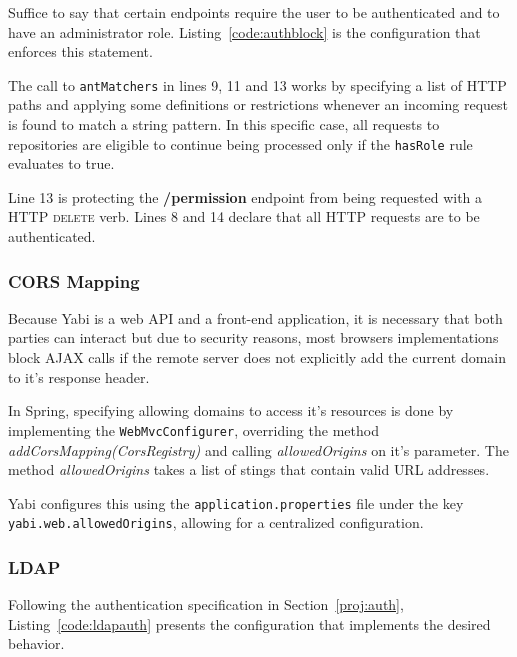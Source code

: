 Suffice to say that certain endpoints require the user to be authenticated and to have an administrator role. Listing~\ref{code:authblock} is the configuration that enforces this statement.

The call to \texttt{antMatchers} in lines 9, 11 and 13 works by specifying a list of \gls{HTTP} paths and applying some definitions or restrictions whenever an incoming request is found to match a string pattern. In this specific case, all requests to repositories are eligible to continue being processed only if the \texttt{hasRole} rule evaluates to true.

Line 13 is protecting the \textbf{/permission} endpoint from being requested with a \gls{HTTP} \textsc{delete} verb.
Lines 8 and 14 declare that all \gls{HTTP} requests are to be authenticated.



\subsubsection{\gls{CORS} Mapping}

Because \gls{Yabi} is a web \gls{API} and a front-end application, it is necessary that both parties can interact but due to security reasons, most browsers implementations block \gls{AJAX} calls if the remote server does not explicitly add the current domain to it's response header.

In Spring, specifying allowing domains to access it's resources is done by implementing the \texttt{WebMvcConfigurer}, overriding the method \textit{addCorsMapping(CorsRegistry)} and calling \textit{allowedOrigins} on it's parameter. The method \textit{allowedOrigins} takes a list of stings that contain valid \gls{URL} addresses.

\gls{Yabi} configures this using the \texttt{application.properties} file under the key \texttt{yabi.web.allowedOrigins}, allowing for a centralized configuration.

\subsubsection{\gls{LDAP}}\label{impl:ldap}

Following the authentication specification in Section~\ref{proj:auth}, Listing~\ref{code:ldapauth} presents the configuration that implements the desired behavior.

